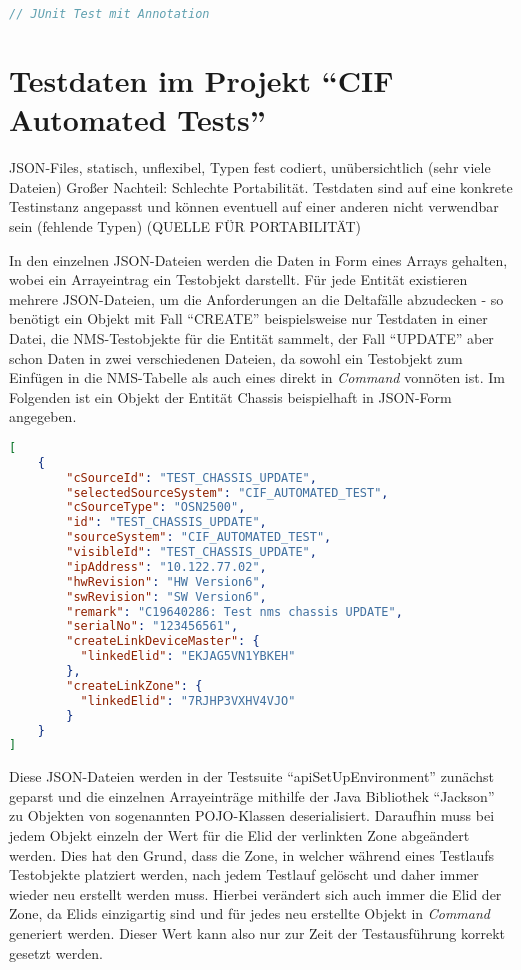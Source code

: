 \begin{lstlisting}[caption=Ein Test in JUnit mit Annotationen, label=JUnit-Test,language=Java]
    // JUnit Test mit Annotation
\end{lstlisting}

\section{Testdaten im Projekt \enquote{CIF Automated Tests}}\label{sec:testdatenIst}
\ac{JSON}-Files, statisch, unflexibel, Typen fest codiert, unübersichtlich (sehr viele Dateien)
Großer Nachteil: Schlechte Portabilität. Testdaten sind auf eine konkrete Testinstanz angepasst und können eventuell auf einer anderen nicht verwendbar sein (fehlende Typen) (QUELLE FÜR PORTABILITÄT)

In den einzelnen \ac{JSON}-Dateien werden die Daten in Form eines Arrays gehalten, wobei ein Arrayeintrag ein Testobjekt darstellt. Für jede Entität existieren mehrere \ac{JSON}-Dateien, um die Anforderungen an die Deltafälle abzudecken - so benötigt ein Objekt mit Fall \enquote{CREATE} beispielsweise nur Testdaten in einer Datei, die \ac*{NMS}-Testobjekte für die Entität sammelt, der Fall \enquote{UPDATE} aber schon Daten in zwei verschiedenen Dateien, da sowohl ein Testobjekt zum Einfügen in die \ac*{NMS}-Tabelle als auch eines direkt in \textit{Command} vonnöten ist. Im Folgenden ist ein Objekt der Entität Chassis beispielhaft in \ac{JSON}-Form angegeben.

\begin{lstlisting}[caption=Testdaten für ein Chassis in JSON-Form, label=JSON-Testdaten,language=json]
[
    {
        "cSourceId": "TEST_CHASSIS_UPDATE",
        "selectedSourceSystem": "CIF_AUTOMATED_TEST",
        "cSourceType": "OSN2500",
        "id": "TEST_CHASSIS_UPDATE",
        "sourceSystem": "CIF_AUTOMATED_TEST",
        "visibleId": "TEST_CHASSIS_UPDATE",
        "ipAddress": "10.122.77.02",
        "hwRevision": "HW Version6",
        "swRevision": "SW Version6",
        "remark": "C19640286: Test nms chassis UPDATE",
        "serialNo": "123456561",
        "createLinkDeviceMaster": {
          "linkedElid": "EKJAG5VN1YBKEH"
        },
        "createLinkZone": {
          "linkedElid": "7RJHP3VXHV4VJO"
        }
    }
]
\end{lstlisting}

Diese \ac{JSON}-Dateien werden in der Testsuite \enquote{apiSetUpEnvironment} zunächst geparst und die einzelnen Arrayeinträge mithilfe der Java Bibliothek \enquote{Jackson} zu Objekten von sogenannten \ac{POJO}-Klassen deserialisiert. Daraufhin muss bei jedem Objekt einzeln der Wert für die \ac{Elid} der verlinkten Zone abgeändert werden. Dies hat den Grund, dass die Zone, in welcher während eines Testlaufs Testobjekte platziert werden, nach jedem Testlauf gelöscht und daher immer wieder neu erstellt werden muss. Hierbei verändert sich auch immer die \ac{Elid} der Zone, da \ac{Elid}s einzigartig sind und für jedes neu erstellte Objekt in \textit{Command} generiert werden. Dieser Wert kann also nur zur Zeit der Testausführung korrekt gesetzt werden.

